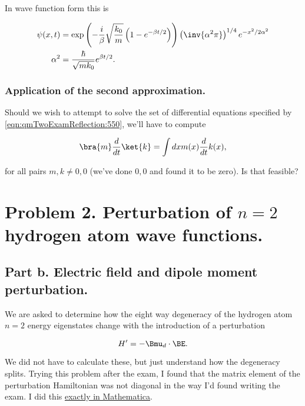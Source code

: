 In wave function form this is

\begin{equation}\label{eqn:qmTwoExamReflection:970}
\begin{aligned}
\psi(x, t)
&=
\exp\left(
- \frac{i}{\beta} \sqrt{\frac{k_0}{m}} 
\left( 1 - e^{-\beta t/2} \right)
\right) 
\left(\inv{\alpha^2\pi}\right)^{1/4} e^{- x^2/2 \alpha^2} \\
\alpha^2 
&= \frac{\hbar}{ \sqrt{m k_0} }
e^{\beta t/2}.
\end{aligned}
\end{equation}

\subsubsection{Application of the second approximation.}

Should we wish to attempt to solve the set of differential equations specified by \ref{eqn:qmTwoExamReflection:550}, we'll have to compute

\begin{equation}\label{eqn:qmTwoExamReflection:n}
\bra{m} \frac{d}{dt} \ket{k} = \int dx m(x) \frac{d}{dt} k(x),
\end{equation}

for all pairs $m, k \ne 0, 0$ (we've done $0,0$ and found it to be zero).  Is that feasible?

\section{Problem 2.  Perturbation of $n=2$ hydrogen atom wave functions.}

\subsection{Part b.  Electric field and dipole moment perturbation.}

We are asked to determine how the eight way degeneracy of the hydrogen atom $n=2$ energy eigenstates change with the introduction of a perturbation

\begin{equation}\label{eqn:qmTwoExamReflection:570}
H' = -\Bmu_d \cdot \BE.
\end{equation}

We did not have to calculate these, but just understand how the degeneracy splits.  Trying this problem after the exam, I found that the matrix element of the perturbation Hamiltonian was not diagonal in the way I'd found writing the exam.  I did this \href{https://github.com/peeterjoot/physicsplay/blob/master/notes/phy456/qmTwoExamReflection.cdf}{exactly in Mathematica}.

